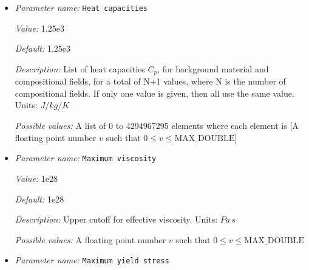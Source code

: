 \begin{itemize}
{\it Value:} 3


{\it Default:} 3


{\it Description:} List of grain size exponents, $m_{\text{diffusion}}$, for background material and compositional fields, for a total of N+1 values, where N is the number of compositional fields. If only one value is given, then all use the same value. Units: None


{\it Possible values:} A list of 0 to 4294967295 elements where each element is [A floating point number $v$ such that $0 \leq v \leq \text{MAX\_DOUBLE}$]
\item {\it Parameter name:} {\tt Heat capacities}
\label{parameters:Material model/Visco Plastic/Heat capacities}
\label{parameters:Material_20model/Visco_20Plastic/Heat_20capacities}


{\it Value:} 1.25e3


{\it Default:} 1.25e3


{\it Description:} List of heat capacities $C_p$, for background material and compositional fields, for a total of N+1 values, where N is the number of compositional fields. If only one value is given, then all use the same value.  Units: $J/kg/K$


{\it Possible values:} A list of 0 to 4294967295 elements where each element is [A floating point number $v$ such that $0 \leq v \leq \text{MAX\_DOUBLE}$]
\item {\it Parameter name:} {\tt Maximum viscosity}
\label{parameters:Material model/Visco Plastic/Maximum viscosity}
\label{parameters:Material_20model/Visco_20Plastic/Maximum_20viscosity}


{\it Value:} 1e28


{\it Default:} 1e28


{\it Description:} Upper cutoff for effective viscosity. Units: $Pa \, s$


{\it Possible values:} A floating point number $v$ such that $0 \leq v \leq \text{MAX\_DOUBLE}$
\item {\it Parameter name:} {\tt Maximum yield stress}
\label{parameters:Material model/Visco Plastic/Maximum yield stress}
\label{parameters:Material_20model/Visco_20Plastic/Maximum_20yield_20stress}



\end{itemize}
